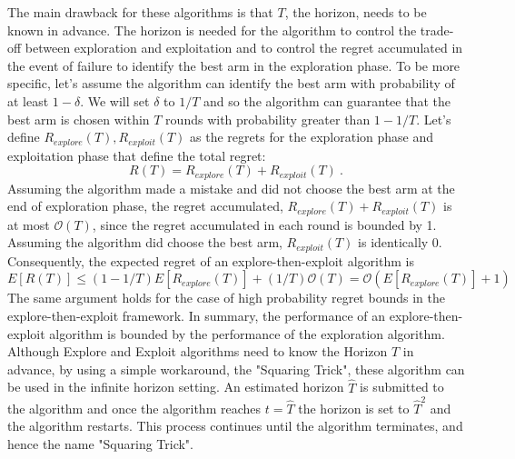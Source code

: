 \documentclass[MSc,beforeExam]{iitcsthesis}
\begin{document}
	The main drawback for these algorithms is that $T$, the horizon, needs to be known in advance. The horizon is needed for the algorithm to control the trade-off between exploration and exploitation and to control the regret accumulated in the event of failure to identify the best arm in the exploration phase.
	To be more specific, let's assume the algorithm can identify the best arm with probability of at least $1-\delta$. We will set $\delta$ to $1/T$ and so the algorithm can guarantee that the best arm is chosen within $T$ rounds with probability greater than $1-1/T$.
	Let's define $R_{explore}(T),R_{exploit}(T)$ as the regrets for the exploration phase and exploitation phase that define the total regret:
	$$R(T) = R_{explore}(T)+R_{exploit}(T)\ .$$
	Assuming the algorithm made a mistake and did not choose the best arm at the end of exploration phase, the regret accumulated, $R_{explore}(T)+R_{exploit}(T)$ is at most $\mathcal{O}(T)$, since the regret accumulated in each round is bounded by 1.
	Assuming the algorithm did choose the best arm, $R_{exploit}(T)$ is identically $0$.
	Consequently, the expected regret of an explore-then-exploit algorithm is
	\begin{equation}
		E[R(T)] \leq (1-1/T)E[R_{explore}(T)] +(1/T)\mathcal{O}(T) = \mathcal{O}(E[R_{explore}(T)]+1)
	\end{equation}
	The same argument holds for the case of high probability regret bounds in the explore-then-exploit framework.
	In summary, the performance of an explore-then-exploit algorithm is bounded by the performance of the exploration algorithm.
	Although Explore and Exploit algorithms need to know the Horizon $T$ in advance, by using a simple workaround, the "Squaring Trick", these algorithm can be used in the infinite horizon setting. An estimated horizon $\hat{T}$ is submitted to the algorithm and once the algorithm reaches $t=\hat{T}$ the horizon is set to $\hat{T}^2$ and the algorithm restarts. This process continues until the algorithm terminates, and hence the name "Squaring Trick".
	
\end{document}

